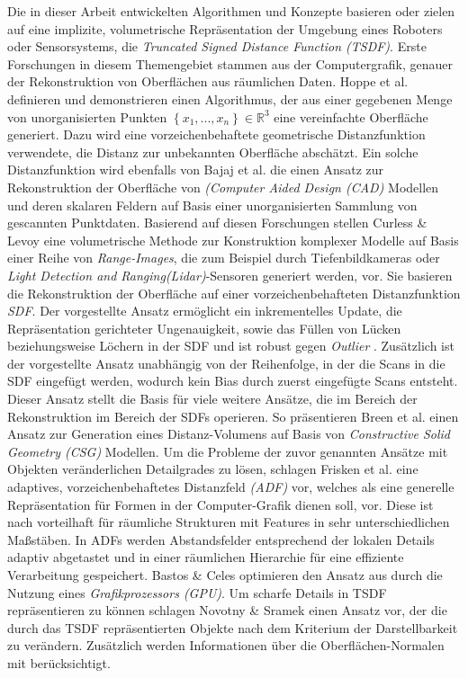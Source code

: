 Die in dieser Arbeit entwickelten Algorithmen und Konzepte basieren oder zielen auf eine implizite, volumetrische Repräsentation der Umgebung eines Roboters oder Sensorsystems, die \emph{Truncated Signed Distance Function (TSDF)}. Erste Forschungen in diesem Themengebiet stammen aus der Computergrafik, genauer der Rekonstruktion von Oberflächen aus räumlichen Daten. Hoppe et al. definieren und demonstrieren einen Algorithmus, der aus einer gegebenen Menge von unorganisierten Punkten $\left\lbrace x_1, ..., x_n \right\rbrace \in \mathbb{R}^3$ eine vereinfachte Oberfläche generiert. Dazu wird eine vorzeichenbehaftete geometrische Distanzfunktion verwendete, die Distanz zur unbekannten Oberfläche abschätzt. Ein solche Distanzfunktion wird ebenfalls von Bajaj et al. \cite{bajaj1995automatic} die einen Ansatz zur Rekonstruktion der Oberfläche von \emph{(Computer Aided Design (CAD)} Modellen und deren skalaren Feldern auf Basis einer unorganisierten Sammlung von gescannten Punktdaten. Basierend auf diesen Forschungen stellen Curless \& Levoy \cite{curless1996volumetric} eine volumetrische Methode zur Konstruktion komplexer Modelle auf Basis einer Reihe von \emph{Range-Images}, die zum Beispiel durch Tiefenbildkameras oder \emph{Light Detection and Ranging(Lidar)}-Sensoren generiert werden, vor. Sie basieren die Rekonstruktion der Oberfläche auf einer vorzeichenbehafteten Distanzfunktion \emph{SDF}. Der vorgestellte Ansatz ermöglicht ein inkrementelles Update, die Repräsentation gerichteter Ungenauigkeit, sowie das Füllen von Lücken beziehungsweise Löchern in der SDF und ist robust gegen \emph{Outlier} \cite{curless1996volumetric}. Zusätzlich ist der vorgestellte Ansatz unabhängig von der Reihenfolge, in der die Scans in die SDF eingefügt werden, wodurch kein Bias durch zuerst eingefügte Scans entsteht. Dieser Ansatz stellt die Basis für viele weitere Ansätze, die im Bereich der Rekonstruktion im Bereich der SDFs operieren. So präsentieren Breen et al. \cite{breen19983d} einen Ansatz zur Generation eines Distanz-Volumens auf Basis von \emph{Constructive Solid Geometry (CSG)} Modellen. Um die Probleme der zuvor genannten Ansätze mit Objekten veränderlichen Detailgrades zu lösen, schlagen Frisken et al. \cite{frisken2000adaptively} eine adaptives, vorzeichenbehaftetes Distanzfeld \emph{(ADF)} vor, welches als eine generelle Repräsentation für Formen in der Computer-Grafik dienen soll, vor. Diese ist nach \cite{frisken2000adaptively} vorteilhaft für räumliche Strukturen mit Features in sehr unterschiedlichen Maßstäben. In ADFs werden Abstandsfelder entsprechend der lokalen Details adaptiv abgetastet und in einer räumlichen Hierarchie für eine effiziente Verarbeitung gespeichert. Bastos \& Celes optimieren den Ansatz aus \cite{frisken2000adaptively} durch die Nutzung eines \emph{Grafikprozessors (GPU)}. Um scharfe Details in TSDF repräsentieren zu können schlagen Novotny \& Sramek \cite{novotny2005representation} einen Ansatz vor, der die durch das TSDF repräsentierten Objekte nach dem Kriterium der Darstellbarkeit zu verändern. Zusätzlich werden Informationen über die Oberflächen-Normalen mit berücksichtigt.
